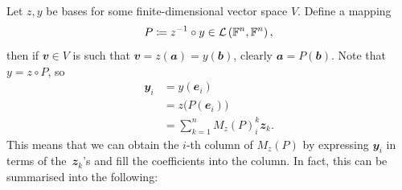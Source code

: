 \documentclass[math]{amznotes}
\theoremstyle{remark}
\begin{document}
Let $z, y$ be bases for some finite-dimensional vector space $V$. Define a mapping
\begin{equation*}
    P \coloneqq z^{-1} \circ y \in \mathcal{L}\left(\mathbb{F}^n, \mathbb{F}^n\right),
\end{equation*}
then if $\mathbfit{v} \in V$ is such that $\mathbfit{v} = z(\mathbfit{a}) = y(\mathbfit{b})$, clearly $\mathbfit{a} = P(\mathbfit{b})$. Note that $y = z \circ P$, so
\begin{align*}
    \mathbfit{y}_i & = y(\mathbfit{e}_i) \\
    & = z\bigl(P(\mathbfit{e}_i)\bigr) \\
    & = \sum_{k = 1}^{n}M_z(P)^k_i\mathbfit{z}_k.
\end{align*} 
This means that we can obtain the $i$-th column of $M_z(P)$ by expressing $\mathbfit{y}_i$ in terms of the~$\mathbfit{z}_k$'s and fill the coefficients into the column. In fact, this can be summarised into the following:
\end{document}
